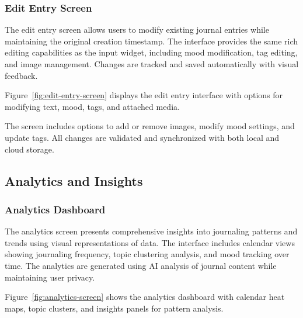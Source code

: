 \subsubsection{Edit Entry Screen}

The edit entry screen allows users to modify existing journal entries while maintaining the original creation timestamp. The interface provides the same rich editing capabilities as the input widget, including mood modification, tag editing, and image management. Changes are tracked and saved automatically with visual feedback.

Figure~\ref{fig:edit-entry-screen} displays the edit entry interface with options for modifying text, mood, tags, and attached media.


The screen includes options to add or remove images, modify mood settings, and update tags. All changes are validated and synchronized with both local and cloud storage.

\subsection{Analytics and Insights}

\subsubsection{Analytics Dashboard}

The analytics screen presents comprehensive insights into journaling patterns and trends using visual representations of data. The interface includes calendar views showing journaling frequency, topic clustering analysis, and mood tracking over time. The analytics are generated using AI analysis of journal content while maintaining user privacy.

Figure~\ref{fig:analytics-screen} shows the analytics dashboard with calendar heat maps, topic clusters, and insights panels for pattern analysis.


